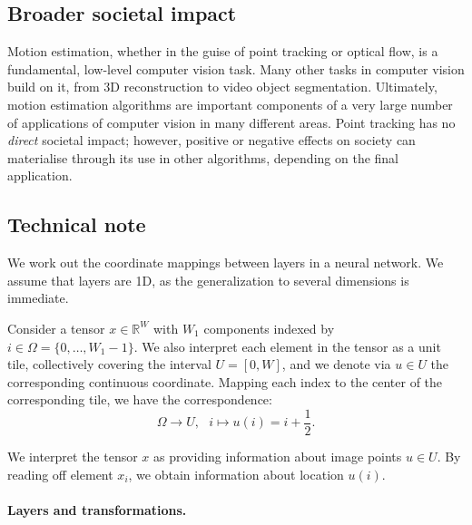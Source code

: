 \subsection{Broader societal impact}

Motion estimation, whether in the guise of point tracking or optical flow, is a fundamental, low-level computer vision task.
Many other tasks in computer vision build on it, from 3D reconstruction to video object segmentation.
Ultimately, motion estimation algorithms are important components of a very large number of applications of computer vision in many different areas.
Point tracking has no \emph{direct} societal impact; however, positive or negative effects on society can materialise through its use in other algorithms, depending on the final application.

\subsection{Technical note}

We work out the coordinate mappings between layers in a neural network.
We assume that layers are 1D, as the generalization to several dimensions is immediate.

Consider a tensor $x \in \mathbb{R}^{W}$ with $W_1$ components indexed by $i\in \Omega = \{0,\dots,W_1-1\}$.
We also interpret each element in the tensor as a unit tile, collectively covering the interval $U = [0,W]$, and we denote via $u \in U$ the corresponding continuous coordinate.
Mapping each index to the center of the corresponding tile, we have the correspondence:
$$
\Omega \rightarrow U,
~~~
i \mapsto u(i) = i + \frac{1}{2}.
$$

We interpret the tensor $x$ as providing information about image points $u \in U$.
By reading off element $x_i$, we obtain information about location $u(i)$.

\paragraph{Layers and transformations.}

